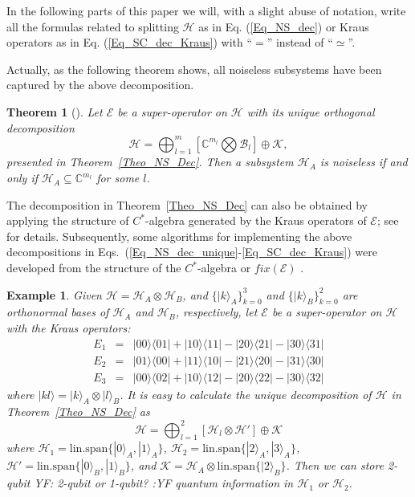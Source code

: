 \documentclass[journal]{IEEEtran}
\def\h{\ensuremath{\mathcal{H}}}
\def\k{\ensuremath{\mathcal{K}}}
\def\b{\ensuremath{\mathcal{B}}}
\def\e{\ensuremath{\mathcal{E}}}
\def\k{\mathcal{K}}
\newtheorem{theorem}{Theorem}
\newtheorem{example}{Example}
\newcommand{\authorComment}[3]{\color{#1}#2: {#3} :#2\color{black}}
\newcommand{\yf}[1]{\authorComment{blue}{YF}{#1}}
\begin{document}
In the following parts of this paper we will, with a slight abuse of notation,
write all the formulas related to splitting $\h$ as in Eq. (\ref{Eq_NS_dec})  or Kraus operators as in Eq. (\ref{Eq_SC_dec_Kraus}) with ``$=$'' instead of ``$\simeq$''.

Actually, as the following theorem shows, all noiseless subsystems have been captured by the above decomposition.
\begin{theorem}[\cite{blume2010information}]
  Let $\e$ be a super-operator on $\h$ with its unique orthogonal decomposition
   $$\h=\bigoplus_{l=1}^m\left[\mathbb{C}^{m_l}\bigotimes\b_l\right]\oplus\k,$$
   presented in Theorem~\ref{Theo_NS_Dec}. Then
    a subsystem $\h_A$ is noiseless if and only if $\h_A\subseteq \mathbb{C}^{m_l}$ for some $l$.
\end{theorem}

The decomposition in Theorem~\ref{Theo_NS_Dec} can also be obtained by applying the structure of  $C^*$-algebra generated by the Kraus operators of $\e$; see \cite{choi2006method} for details. Subsequently, some algorithms for implementing the above decompositions in Eqs.~(\ref{Eq_NS_dec_unique}-\ref{Eq_SC_dec_Kraus}) were developed from the structure of the $C^*$-algebra   or $fix(\e)$   \cite{guan2016decomposition,knill2006protected,wang2013numerical}.  

\begin{example}
  Given $\h=\h_A\otimes \h_B$, and $\{|k\rangle_A\}_{k=0}^3$ and $\{|k\rangle_B\}_{k=0}^2$ are orthonormal bases of $\h_A$ and $\h_B$, respectively, let $\e$ be a super-operator on $\h$ with the Kraus operators:
  \begin{eqnarray*}
    E_{1}&=&|00\rangle\langle01|+|10\rangle\langle11|-|20\rangle\langle21|-|30\rangle\langle31|\\
    E_{2}&=&|01\rangle\langle00|+|11\rangle\langle10|-|21\rangle\langle20|-|31\rangle\langle30|\\
    E_{3}&=&|00\rangle\langle02|+|10\rangle\langle12|-|20\rangle\langle22|-|30\rangle\langle32|
  \end{eqnarray*}
  where $|kl\rangle=|k\rangle_A\otimes |l\rangle_B$. It is easy to calculate the unique decomposition of $\h$ in Theorem~\ref{Theo_NS_Dec} as 
  $$\h=\bigoplus_{l=1}^2\left[\h_l\otimes \h'\right] \oplus\k$$
  where $\h_1=\textrm{lin.span}\{|0\rangle_A,|1\rangle_A\}$, $\h_2=\textrm{lin.span}\{|2\rangle_A,|3\rangle_A\}$, $\h'=\textrm{lin.span}\{|0\rangle_B,|1\rangle_B\}$, and $\k = \h_A\otimes \textrm{lin.span}\{|2\rangle_B\}$. Then we can store 2-qubit \yf{2-qubit or 1-qubit?} quantum information in $\h_1$ or $\h_2$.
\end{example}
\end{document}
